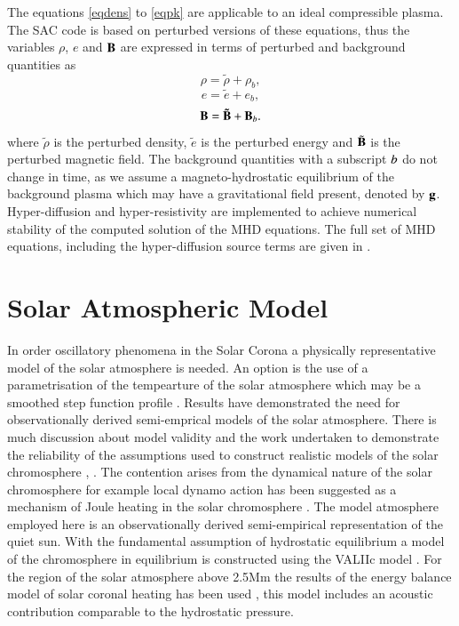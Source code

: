 \documentclass[final,1p]{elsarticle}
\begin{document}
The equations \eqref{eqdens} to \eqref{eqpk} are applicable to an ideal compressible plasma. The SAC code is based on perturbed versions of these equations, thus the variables $\rho $, $e$ and  $\bf B$ are expressed in terms of perturbed and background quantities as
\begin{equation}
\rho = \tilde{\rho}+\rho _{b},
\end{equation}
\begin{equation}
e = \tilde{e}+e _{b},
\end{equation}
\begin{equation}
\bf B = \tilde{\bf B}+{\bf B}_{\it{b}}.
\end{equation}
where $\tilde{\rho}$ is the  perturbed density,  $\tilde{e}$ is the perturbed energy and $\tilde{\bf B}$  is the perturbed magnetic field. The background quantities with a subscript $\it{b}$ do not change in time, as we assume a magneto-hydrostatic equilibrium of the background plasma which may have a gravitational field present, denoted by $\bf g$. Hyper-diffusion and hyper-resistivity \cite{Caunt2001}
are implemented to achieve numerical stability of the computed solution of the MHD equations.  The full set of MHD equations, including the hyper-diffusion source terms are given in \cite{Griffiths2015}\cite{Shelyag2008}.











\section{Solar Atmospheric Model}
In order oscillatory phenomena in the Solar Corona a physically representative model of the solar atmosphere is needed. An option is the use of a parametrisation of the tempearture of the solar atmosphere which may be a smoothed step function profile  \cite{Murawski2010}. Results have demonstrated the need for observationally derived semi-emprical models of the solar atmosphere. There is much discussion about model validity and the work undertaken to demonstrate the reliability of the assumptions used to construct realistic models of the solar chromosphere \cite{Carlsson1995}, \cite{Kalkofen2012}. The contention arises from the dynamical nature of the solar chromosphere for example local dynamo action has been suggested as a mechanism of Joule heating in the solar chromosphere \cite{Leenaarts2011}. The model atmosphere employed here is an observationally derived semi-empirical representation of the quiet sun. With the fundamental assumption of hydrostatic equilibrium a model of the chromosphere in equilibrium is constructed using the VALIIc model \cite{Vernazza1981}. For the region of the solar atmosphere above 2.5Mm the results of the energy balance model of solar coronal heating has been used  \cite{McWhirter1975}, this model includes an acoustic contribution comparable to the hydrostatic pressure.
\end{document}
